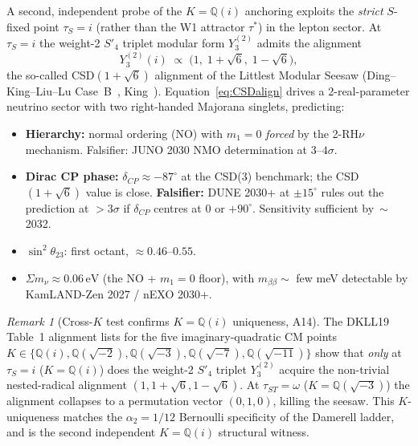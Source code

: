 \documentclass[a4paper,11pt]{article}
\newcommand{\Spf}{S'_4}
\newcommand{\Qi}{\mathbb{Q}(i)}
\theoremstyle{definition}
\theoremstyle{remark}
\newtheorem{remark}[theorem]{Remark}
\begin{document}
A second, independent probe of the $K=\Qi$ anchoring exploits the
\emph{strict} $S$-fixed point $\tau_S=i$ (rather than the W1 attractor
$\tau^{*}$) in the lepton sector.  At $\tau_S=i$ the weight-2 $\Spf$
triplet modular form $Y_3^{(2)}$ admits the alignment
\begin{equation}
\label{eq:CSDalign}
  Y_3^{(2)}(i) \;\propto\; \bigl(1,\;1+\sqrt{6},\;1-\sqrt{6}\bigr),
\end{equation}
the so-called CSD$(1+\sqrt{6})$ alignment of the Littlest Modular
Seesaw (Ding--King--Liu--Lu Case~B~\cite{DKLL19},
King~\cite{LMS22}).  Equation~\eqref{eq:CSDalign} drives a
2-real-parameter neutrino sector with two right-handed Majorana
singlets, predicting:
\begin{itemize}
  \item \textbf{Hierarchy:} normal ordering (NO) with $m_1 = 0$
    \emph{forced} by the 2-RH$\nu$ mechanism.  Falsifier: JUNO 2030
    NMO determination at $3$--$4\sigma$.
  \item \textbf{Dirac CP phase:} $\delta_{CP} \approx -87^{\circ}$ at
    the CSD(3) benchmark; the CSD$(1+\sqrt 6)$ value is close.
    \textbf{Falsifier:} DUNE 2030+ at $\pm 15^{\circ}$ rules out the
    prediction at $>3\sigma$ if $\delta_{CP}$ centres at $0$ or
    $+90^{\circ}$. Sensitivity sufficient by~$\sim$2032.
  \item $\sin^{2}\theta_{23}$: first octant, $\approx 0.46$--$0.55$.
  \item $\Sigma m_\nu \approx 0.06\,\mathrm{eV}$ (the NO + $m_1=0$
    floor), with $m_{\beta\beta}\sim$ few meV detectable by KamLAND-Zen
    2027 / nEXO 2030+.
\end{itemize}

\begin{remark}[Cross-$K$ test confirms $K=\Qi$ uniqueness, A14]
The DKLL19 Table~1 alignment lists for the five imaginary-quadratic
CM points $K\in\{\Qi,\mathbb{Q}(\sqrt{-2}),\mathbb{Q}(\sqrt{-3}),
\mathbb{Q}(\sqrt{-7}),\mathbb{Q}(\sqrt{-11})\}$ show that
\emph{only} at $\tau_S=i$ ($K=\Qi$) does the weight-2 $\Spf$ triplet
$Y_3^{(2)}$ acquire the non-trivial nested-radical alignment
$(1,1+\sqrt 6,1-\sqrt 6)$.  At $\tau_{ST}=\omega$ ($K=\mathbb{Q}
(\sqrt{-3})$) the alignment collapses to a permutation vector
$(0,1,0)$, killing the seesaw.  This $K$-uniqueness matches the
$\alpha_2=1/12$ Bernoulli specificity of the Damerell ladder, and is
the second independent $K=\Qi$ structural witness.
\end{remark}
\end{document}
